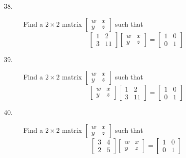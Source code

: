 \documentclass{article}
\begin{document}
\begin{description}
  \item[38.] Find a $2 \times 2$ matrix $\begin{bmatrix} w & x \\ y & z \end{bmatrix}$ such that
    \begin{equation*}
    \begin{bmatrix} 1 & 2 \\ 3&11 \end{bmatrix} \begin{bmatrix} w & x \\ y & z \end{bmatrix} 
    = \begin{bmatrix} 1 & 0 \\ 0 & 1 \end{bmatrix}
    \end{equation*}

  \item[39.] Find a $2 \times 2$ matrix $\begin{bmatrix} w & x \\ y & z \end{bmatrix}$ such that
    \begin{equation*}
    \begin{bmatrix} w & x \\ y & z \end{bmatrix} \begin{bmatrix} 1 & 2 \\ 3 & 11 \end{bmatrix} 
    = \begin{bmatrix} 1 & 0 \\ 0 & 1 \end{bmatrix}
    \end{equation*}

  \item[40.] Find a $2 \times 2$ matrix $\begin{bmatrix} w & x \\ y & z \end{bmatrix}$ such that
    \begin{equation*}
    \begin{bmatrix} 3 & 4 \\ 2 & 5 \end{bmatrix} \begin{bmatrix} w & x \\ y & z \end{bmatrix} 
    = \begin{bmatrix} 1 & 0 \\ 0 & 1 \end{bmatrix}
    \end{equation*}


\end{description}
\end{document}
